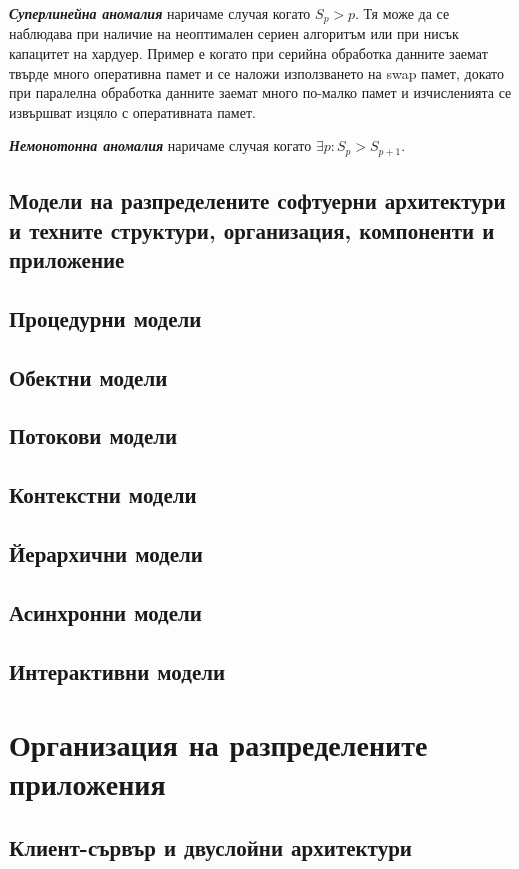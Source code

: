 \documentclass[fleqn,12pt]{article}
\begin{document}
\textbf{\textit{Суперлинейна аномалия}} наричаме случая когато $S_p > p$.
Тя може да се наблюдава при наличие на неоптимален сериен алгоритъм или при нисък капацитет на хардуер.
Пример е когато при серийна обработка данните заемат твърде много оперативна памет и се наложи използването на swap памет, докато при паралелна обработка данните заемат много по-малко памет и изчисленията се извършват изцяло с оперативната памет.

\textbf{\textit{Немонотонна аномалия}} наричаме случая когато $\exists p: S_p > S_{p+1}$.

\subsection{Модели на разпределените софтуерни архитектури и техните структури, организация, компоненти и приложение}

\subsection{Процедурни модели}
\subsection{Обектни модели}
\subsection{Потокови модели}
\subsection{Контекстни модели}
\subsection{Йерархични модели}
\subsection{Асинхронни модели}
\subsection{Интерактивни модели}

\section{Организация на разпределените приложения}

\subsection{Клиент-сървър и двуслойни архитектури}
\end{document}
